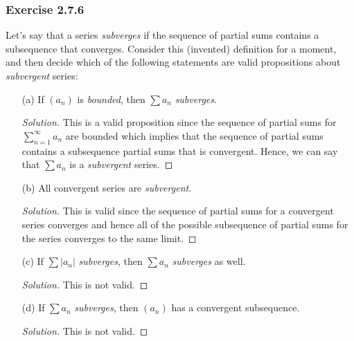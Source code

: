 \subsubsection{Exercise 2.7.6}
Let's say that a series \textit{subverges} if the sequence of partial sums contains a subsequence that converges. Consider this (invented) definition for a  moment, and then decide which of the following statements are valid propositions about \textit{subvergent} series: 
\begin{enumerate}
    \item[(a)] If \( (a_n)\) is \textit{bounded}, then \( \sum a_n \) \textit{subverges}.
        \begin{proof}[Solution]
        This is a valid proposition since the sequence of partial sums for \( \sum_{n=1}^{\infty}a_n\) are bounded which implies that the sequence of partial sums contains a subsequence partial sums that is convergent. Hence, we can say that \( \sum a_n \) is a \textit{subvergent} series. 
        \end{proof}
    \item[(b)] All convergent series are \textit{subvergent}. 
        \begin{proof}[Solution]
        This is valid since the sequence of partial sums for a convergent series converges and hence all of the possible subsequence of partial sums for the series converges to the same limit. 
        \end{proof}
    \item[(c)] If \( \sum |a_n| \) \textit{subverges}, then \(\sum a_n \) \textit{subverges} as well. 
        \begin{proof}[Solution]
        This is not valid. 
        \end{proof}
    \item[(d)] If \( \sum a_n \) \textit{subverges}, then \( (a_n)\) has a convergent subsequence. 
        \begin{proof}[Solution]
        This is not valid.
        \end{proof}
\end{enumerate}

